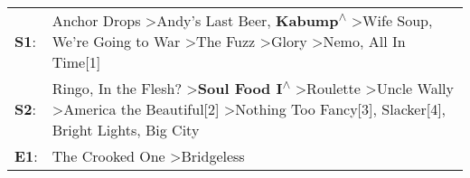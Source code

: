 \begin{supertabular}{p{0.03\textwidth}p{0.92\textwidth}}
 \textbf{S1}:  &                                   Anchor Drops\textsuperscript{} \textgreater \enspace Andy's Last Beer\textsuperscript{}, \enspace \textbf{Kabump\textsuperscript{$\wedge$}} \textgreater \enspace Wife Soup\textsuperscript{}, \enspace We're Going to War\textsuperscript{} \textgreater \enspace The Fuzz\textsuperscript{} \textgreater \enspace Glory\textsuperscript{} \textgreater \enspace Nemo\textsuperscript{}, \enspace All In Time[1]\textsuperscript{}  \enspace  \\
 \textbf{S2}:  &  Ringo\textsuperscript{}, \enspace In the Flesh?\textsuperscript{} \textgreater \enspace \textbf{Soul Food I\textsuperscript{$\wedge$}} \textgreater \enspace Roulette\textsuperscript{} \textgreater \enspace Uncle Wally\textsuperscript{} \textgreater \enspace America the Beautiful[2]\textsuperscript{} \textgreater \enspace Nothing Too Fancy[3]\textsuperscript{}, \enspace Slacker[4]\textsuperscript{}, \enspace Bright Lights, Big City\textsuperscript{}  \enspace  \\
 \textbf{E1}:  &                                                                                                                                                                                                                                                                                                                                                                                  The Crooked One\textsuperscript{} \textgreater \enspace Bridgeless\textsuperscript{}  \enspace  \\
\end{supertabular}
